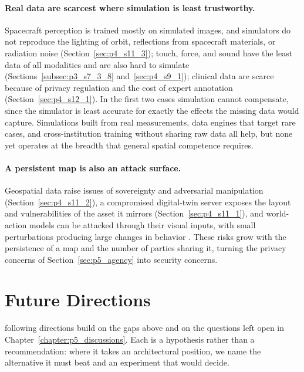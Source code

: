 \paragraph{Real data are scarcest where simulation is least trustworthy.}
Spacecraft perception is trained mostly on simulated images, and simulators do not reproduce the lighting of orbit, reflections from spacecraft materials, or radiation noise (Section~\ref{sec:p4_s11_3}); touch, force, and sound have the least data of all modalities and are also hard to simulate (Sections~\ref{subsec:p3_s7_3_8} and~\ref{sec:p4_s9_1}); clinical data are scarce because of privacy regulation and the cost of expert annotation (Section~\ref{sec:p4_s12_1}).
In the first two cases simulation cannot compensate, since the simulator is least accurate for exactly the effects the missing data would capture.
Simulations built from real measurements, data engines that target rare cases, and cross-institution training without sharing raw data all help, but none yet operates at the breadth that general spatial competence requires.

\paragraph{A persistent map is also an attack surface.}
Geospatial data raise issues of sovereignty and adversarial manipulation (Section~\ref{sec:p4_s11_2}), a compromised digital-twin server exposes the layout and vulnerabilities of the asset it mirrors (Section~\ref{sec:p4_s11_1}), and world-action models can be attacked through their visual inputs, with small perturbations producing large changes in behavior \cite{wu2026pasakv}.
These risks grow with the persistence of a map and the number of parties sharing it, turning the privacy concerns of Section~\ref{sec:p5_agency} into security concerns.




\section{Future Directions}
\label{sec:p5_directions}

 following directions build on the gaps above and on the questions left open in Chapter~\ref{chapter:p5_discussions}.
Each is a hypothesis rather than a recommendation: where it takes an architectural position, we name the alternative it must beat and an experiment that would decide.

